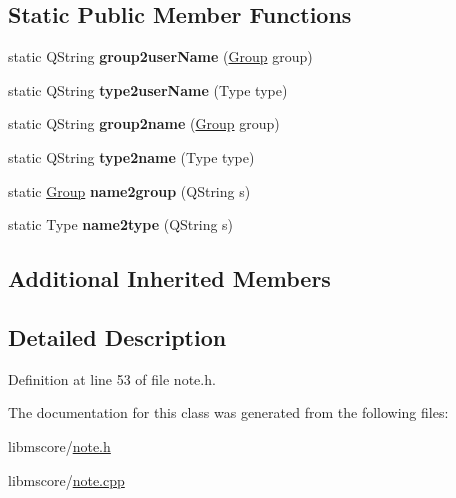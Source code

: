 \subsection*{Static Public Member Functions}
\begin{DoxyCompactItemize}
\item 
\mbox{\label{class_ms_1_1_note_head_a1c242f6f72990378cf9bd1c993ae1861}} 
static Q\+String {\bfseries group2user\+Name} (\hyperlink{class_group}{Group} group)
\item 
\mbox{\label{class_ms_1_1_note_head_aff83cc459d25a338ba253bd390281b65}} 
static Q\+String {\bfseries type2user\+Name} (Type type)
\item 
\mbox{\label{class_ms_1_1_note_head_a10bffe57897d23fd821f7baa882dcd72}} 
static Q\+String {\bfseries group2name} (\hyperlink{class_group}{Group} group)
\item 
\mbox{\label{class_ms_1_1_note_head_a3385acf8a8cb815e7634abf9bc3300e9}} 
static Q\+String {\bfseries type2name} (Type type)
\item 
\mbox{\label{class_ms_1_1_note_head_ac390b4d1bf0db4abf26c0f4ae9884884}} 
static \hyperlink{class_group}{Group} {\bfseries name2group} (Q\+String s)
\item 
\mbox{\label{class_ms_1_1_note_head_a345193a19d64847057b59b0b74a4d2c8}} 
static Type {\bfseries name2type} (Q\+String s)
\end{DoxyCompactItemize}
\subsection*{Additional Inherited Members}


\subsection{Detailed Description}


Definition at line 53 of file note.\+h.



The documentation for this class was generated from the following files\+:\begin{DoxyCompactItemize}
\item 
libmscore/\hyperlink{note_8h}{note.\+h}\item 
libmscore/\hyperlink{note_8cpp}{note.\+cpp}\end{DoxyCompactItemize}
